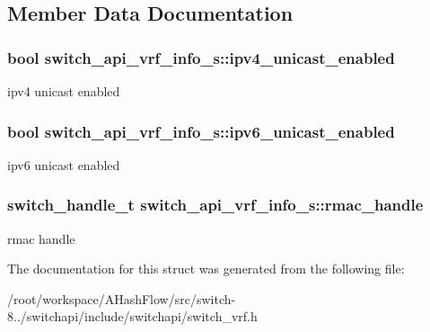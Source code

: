 \subsection{Member Data Documentation}
\hypertarget{structswitch__api__vrf__info__s_a28d658f137adc54c3d41cc093912bcc4}{
\subsubsection[{ipv4\+\_\+unicast\+\_\+enabled}]{\setlength{\rightskip}{0pt plus 5cm}bool switch\+\_\+api\+\_\+vrf\+\_\+info\+\_\+s\+::ipv4\+\_\+unicast\+\_\+enabled}}\label{structswitch__api__vrf__info__s_a28d658f137adc54c3d41cc093912bcc4}
ipv4 unicast enabled \hypertarget{structswitch__api__vrf__info__s_a7e2a8628f52442986e7d476442bd0809}{
\subsubsection[{ipv6\+\_\+unicast\+\_\+enabled}]{\setlength{\rightskip}{0pt plus 5cm}bool switch\+\_\+api\+\_\+vrf\+\_\+info\+\_\+s\+::ipv6\+\_\+unicast\+\_\+enabled}}\label{structswitch__api__vrf__info__s_a7e2a8628f52442986e7d476442bd0809}
ipv6 unicast enabled \hypertarget{structswitch__api__vrf__info__s_aba545a6b833435ce0b569b449fd575c5}{
\subsubsection[{rmac\+\_\+handle}]{\setlength{\rightskip}{0pt plus 5cm}switch\+\_\+handle\+\_\+t switch\+\_\+api\+\_\+vrf\+\_\+info\+\_\+s\+::rmac\+\_\+handle}}\label{structswitch__api__vrf__info__s_aba545a6b833435ce0b569b449fd575c5}
rmac handle 

The documentation for this struct was generated from the following file\+:\begin{DoxyCompactItemize}
\item 
/root/workspace/\+A\+Hash\+Flow/src/switch-\/8../switchapi/include/switchapi/switch\+\_\+vrf.\+h\end{DoxyCompactItemize}
